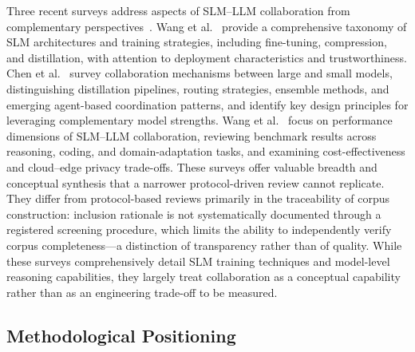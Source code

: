 Three recent surveys address aspects of SLM--LLM collaboration from complementary perspectives~\cite{wang2024slmsurvey,chen2025collabmech,wang2025collabperf}. Wang et al.~\cite{wang2024slmsurvey} provide a comprehensive taxonomy of SLM architectures and training strategies, including fine-tuning, compression, and distillation, with attention to deployment characteristics and trustworthiness. Chen et al.~\cite{chen2025collabmech} survey collaboration mechanisms between large and small models, distinguishing distillation pipelines, routing strategies, ensemble methods, and emerging agent-based coordination patterns, and identify key design principles for leveraging complementary model strengths. Wang et al.~\cite{wang2025collabperf} focus on performance dimensions of SLM--LLM collaboration, reviewing benchmark results across reasoning, coding, and domain-adaptation tasks, and examining cost-effectiveness and cloud--edge privacy trade-offs. These surveys offer valuable breadth and conceptual synthesis that a narrower protocol-driven review cannot replicate. They differ from protocol-based reviews primarily in the traceability of corpus construction: inclusion rationale is not systematically documented through a registered screening procedure, which limits the ability to independently verify corpus completeness---a distinction of transparency rather than of quality. While these surveys comprehensively detail SLM training techniques and model-level reasoning capabilities, they largely treat collaboration as a conceptual capability rather than as an engineering trade-off to be measured.

\subsection{Methodological Positioning}

